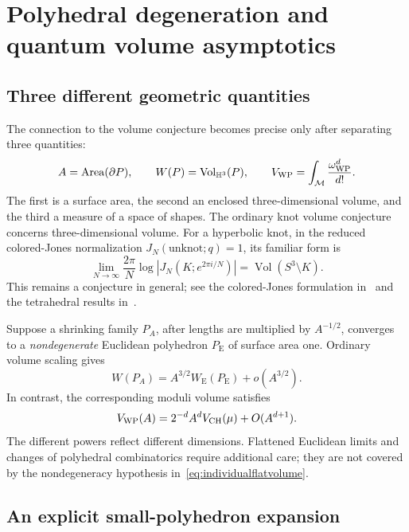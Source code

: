 \section{Polyhedral degeneration and quantum volume asymptotics}
\label{sec:quantumdegeneration}

\subsection{Three different geometric quantities}

The connection to the volume conjecture becomes precise only after
separating three quantities:
\[
 A=\operatorname{Area}(\partial P),\qquad
 W(P)=\operatorname{Vol}_{\mathbb H^3}(P),\qquad
 V_{\mathrm{WP}}=\int_{\mathcal M}\frac{\omega_{\mathrm{WP}}^d}{d!}.
\]
The first is a surface area, the second an enclosed three-dimensional
volume, and the third a measure of a space of shapes. The ordinary
knot volume conjecture concerns three-dimensional volume. For a
hyperbolic knot, in the reduced colored-Jones normalization
$J_N(\text{unknot};q)=1$, its familiar form is
\begin{equation}
 \lim_{N\to\infty}\frac{2\pi}{N}
 \log\left|J_N(K;e^{2\pi i/N})\right|
 =\operatorname{Vol}(S^3\setminus K).
 \label{eq:volumeconjecture}
\end{equation}
This remains a conjecture in general; see the colored-Jones
formulation in~\cite{MurakamiMurakami} and the tetrahedral
results in~\cite{Costantino}.

Suppose a shrinking family $P_A$, after lengths are multiplied by
$A^{-1/2}$, converges to a \emph{nondegenerate} Euclidean polyhedron
$P_{\mathrm E}$ of surface area one. Ordinary volume scaling gives
\begin{equation}
 W(P_A)=A^{3/2}W_{\mathrm E}(P_{\mathrm E})+o(A^{3/2}).
 \label{eq:individualflatvolume}
\end{equation}
In contrast, the corresponding moduli volume satisfies
\[
 V_{\mathrm{WP}}(A)=2^{-d}A^d V_{\mathrm{CH}}(\mu)+O(A^{d+1}).
\]
The different powers reflect different dimensions. Flattened
Euclidean limits and changes of polyhedral combinatorics require
additional care; they are not covered by the nondegeneracy
hypothesis in~\eqref{eq:individualflatvolume}.

\subsection{An explicit small-polyhedron expansion}

